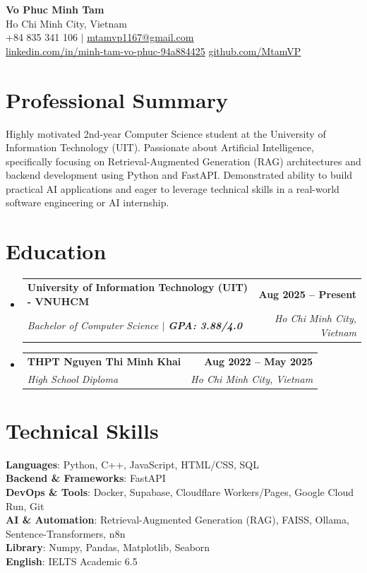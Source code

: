 \documentclass[letterpaper,11pt]{article}
\makeatletter
\newcommand{\resumeEduHeading}[4]{
  \vspace{-2pt}\item
    \begin{tabular*}{1.0\textwidth}[t]{l@{\extracolsep{\fill}}r}
      \textbf{#1} & \textbf{#2} \\
      \textit{\small#3} & \textit{\small #4} \\
    \end{tabular*}\vspace{-7pt}
}
\newcommand{\resumeSubHeadingListStart}{\begin{itemize}[leftmargin=0.0in, label={}]}
\newcommand{\resumeSubHeadingListEnd}{\end{itemize}}
\makeatother
\begin{document}
\begin{center}
    \textbf{\Huge Vo Phuc Minh Tam} \\ \vspace{4pt}
    \small Ho Chi Minh City, Vietnam \\ \vspace{2pt}
    \small +84 835 341 106 $|$ \href{mailto:mtamvp1167@gmail.com}{\underline{mtamvp1167@gmail.com}} \\
    \href{https://www.linkedin.com/in/minh-tam-vo-phuc-94a884425}{\underline{linkedin.com/in/minh-tam-vo-phuc-94a884425}} \quad
    \href{https://github.com/MtamVP}{\underline{github.com/MtamVP}}
\end{center}

\section{Professional Summary}
 \small{Highly motivated 2nd-year Computer Science student at the University of Information Technology (UIT). Passionate about Artificial Intelligence, specifically focusing on Retrieval-Augmented Generation (RAG) architectures and backend development using Python and FastAPI. Demonstrated ability to build practical AI applications and eager to leverage technical skills in a real-world software engineering or AI internship.} \vspace{4pt}
 
\section{Education}
  \resumeSubHeadingListStart
    \resumeEduHeading
      {University of Information Technology (UIT) - VNUHCM}{Aug 2025 -- Present}
      {Bachelor of Computer Science $|$ \textbf{GPA: 3.88/4.0}}{Ho Chi Minh City, Vietnam}
    \resumeEduHeading
      {THPT Nguyen Thi Minh Khai}{Aug 2022 -- May 2025}
      {High School Diploma}{Ho Chi Minh City, Vietnam}
  \resumeSubHeadingListEnd

\section{Technical Skills}
 \begin{itemize}[leftmargin=0.15in, label={}]
    \small{\item{
     \textbf{Languages}{: Python, C++, JavaScript, HTML/CSS, SQL} \\
     \textbf{Backend \& Frameworks}{: FastAPI} \\
     \textbf{DevOps \& Tools}{: Docker, Supabase, Cloudflare Workers/Pages, Google Cloud Run, Git} \\
     \textbf{AI \& Automation}{: Retrieval-Augmented Generation (RAG), FAISS, Ollama, Sentence-Transformers, n8n} \\
     \textbf{Library}{: Numpy, Pandas, Matplotlib, Seaborn}\\
     \textbf{English}{: IELTS Academic 6.5}
    }}
 \end{itemize}
\end{document}
